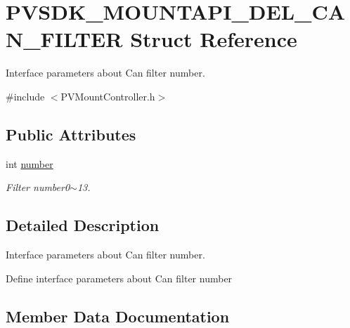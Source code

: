 \hypertarget{struct_p_v_s_d_k___m_o_u_n_t_a_p_i___d_e_l___c_a_n___f_i_l_t_e_r}{}\section{P\+V\+S\+D\+K\+\_\+\+M\+O\+U\+N\+T\+A\+P\+I\+\_\+\+D\+E\+L\+\_\+\+C\+A\+N\+\_\+\+F\+I\+L\+T\+ER Struct Reference}
\label{struct_p_v_s_d_k___m_o_u_n_t_a_p_i___d_e_l___c_a_n___f_i_l_t_e_r}


Interface parameters about Can filter number.  




{\ttfamily \#include $<$P\+V\+Mount\+Controller.\+h$>$}

\subsection*{Public Attributes}
\begin{DoxyCompactItemize}
\item 
int \hyperlink{struct_p_v_s_d_k___m_o_u_n_t_a_p_i___d_e_l___c_a_n___f_i_l_t_e_r_a152679952f37646ab0ed152d29f2e61c}{number}
\begin{DoxyCompactList}\small\item\em Filter number0$\sim$13. \end{DoxyCompactList}\end{DoxyCompactItemize}


\subsection{Detailed Description}
Interface parameters about Can filter number. 

Define interface parameters about Can filter number 

\subsection{Member Data Documentation}
\mbox{\label{struct_p_v_s_d_k___m_o_u_n_t_a_p_i___d_e_l___c_a_n___f_i_l_t_e_r_a152679952f37646ab0ed152d29f2e61c}} 
